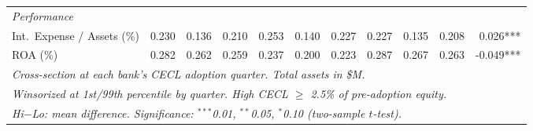 \begin{tabular}{lrrr rrr rrr r}
  \midrule
  \emph{Performance} & & & & & & & & & & \\
  \hspace{1em}Int.\ Expense / Assets (\%) & 0.230 & 0.136 & 0.210 & 0.253 & 0.140 & 0.227 & 0.227 & 0.135 & 0.208 & 0.026*** \\
  \hspace{1em}ROA (\%) & 0.282 & 0.262 & 0.259 & 0.237 & 0.200 & 0.223 & 0.287 & 0.267 & 0.263 & -0.049*** \\
  \midrule
  \midrule
  \multicolumn{11}{l}{\emph{Cross-section at each bank's CECL adoption quarter. Total assets in \$M.}} \\
  \multicolumn{11}{l}{\emph{Winsorized at 1st/99th percentile by quarter. High CECL $\geq$ 2.5\% of pre-adoption equity.}} \\
  \multicolumn{11}{l}{\emph{Hi$-$Lo: mean difference. Significance: $^{***}$0.01, $^{**}$0.05, $^{*}$0.10 (two-sample $t$-test).}} \\
\end{tabular}
\par\endgroup
